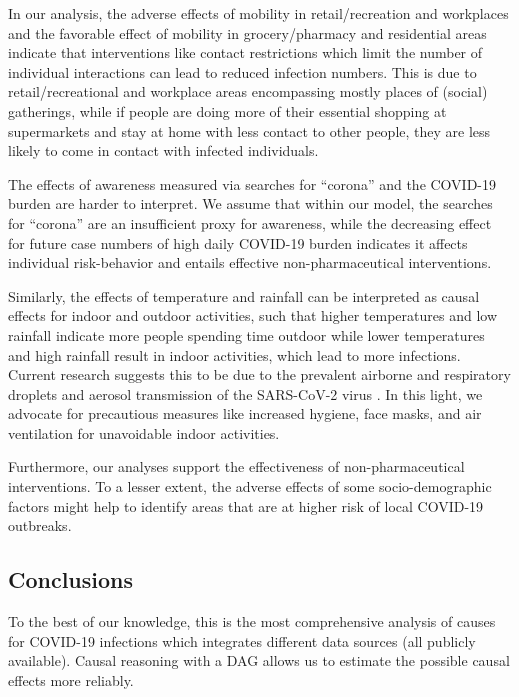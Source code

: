 \documentclass[]{elsarticle} %
\begin{document}
In our analysis, the adverse effects of mobility in retail/recreation and workplaces and the favorable effect of mobility in grocery/pharmacy and residential areas indicate that interventions like contact restrictions which limit the number of individual interactions can lead to reduced infection numbers. This is due to retail/recreational and workplace areas encompassing mostly places of (social) gatherings, while if people are doing more of their essential shopping at supermarkets and stay at home with less contact to other people, they are less likely to come in contact with infected individuals.

The effects of awareness measured via searches for ``corona'' and the COVID-19 burden are harder to interpret. We assume that within our model, the searches for ``corona'' are an insufficient proxy for awareness, while the decreasing effect for future case numbers of high daily COVID-19 burden indicates it affects individual risk-behavior and entails effective non-pharmaceutical interventions.

Similarly, the effects of temperature and rainfall can be interpreted as causal effects for indoor and outdoor activities, such that higher temperatures and low rainfall indicate more people spending time outdoor while lower temperatures and high rainfall result in indoor activities, which lead to more infections. Current research suggests this to be due to the prevalent airborne and respiratory droplets and aerosol transmission of the SARS-CoV-2 virus \citep{world2020transmission}. In this light, we advocate for precautious measures like increased hygiene, face masks, and air ventilation for unavoidable indoor activities.

Furthermore, our analyses support the effectiveness of non-pharmaceutical interventions. To a lesser extent, the adverse effects of some socio-demographic factors might help to identify areas that are at higher risk of local COVID-19 outbreaks.

\hypertarget{conclusions}{%
\subsection{Conclusions}\label{conclusions}}

To the best of our knowledge, this is the most comprehensive analysis of causes for COVID-19 infections which integrates different data sources (all publicly available). Causal reasoning with a DAG allows us to estimate the possible causal effects more reliably.
\end{document}
